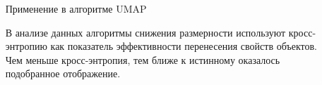 \documentclass[final]{beamer}
\newlength{\sepwid}
\newlength{\onecolwid}
\newlength{\twocolwid}
\begin{document}
\begin{frame}[t]
\begin{columns}[t]
\begin{column}{\twocolwid}

\begin{columns}[t,totalwidth=\twocolwid] %

\begin{column}{\onecolwid} %



\end{column} %

\begin{column}{\onecolwid} %





\end{column} %

\end{columns} %

\end{column} %

\begin{column}{\sepwid}\end{column} %

\begin{column}{\onecolwid} %

\begin{block}{Применение в алгоритме UMAP}
	
	В анализе данных алгоритмы снижения размерности используют кросс-энтропию как показатель эффективности перенесения свойств объектов. Чем меньше кросс-энтропия, тем ближе к истинному оказалось подобранное отображение.


\end{block}
\end{column}
\end{columns}
\end{frame}
\end{document}
